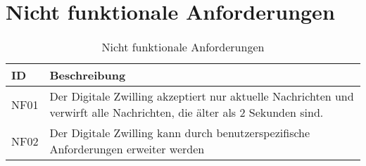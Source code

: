 \section{Nicht funktionale Anforderungen}

\begin{table}[h]
    \begin{tabular}{ l p{12cm}}
        ID & Beschreibung  \\
        \hline
        NF01 & Der Digitale Zwilling akzeptiert nur aktuelle Nachrichten und verwirft alle Nachrichten, die älter als 2 Sekunden sind. \\
        NF02 & Der Digitale Zwilling kann durch benutzerspezifische Anforderungen erweiter werden \\   
    \end{tabular}
    \caption{Nicht funktionale Anforderungen}\label{table:nicht Funktionale Anforderungen}
    
\end{table}



